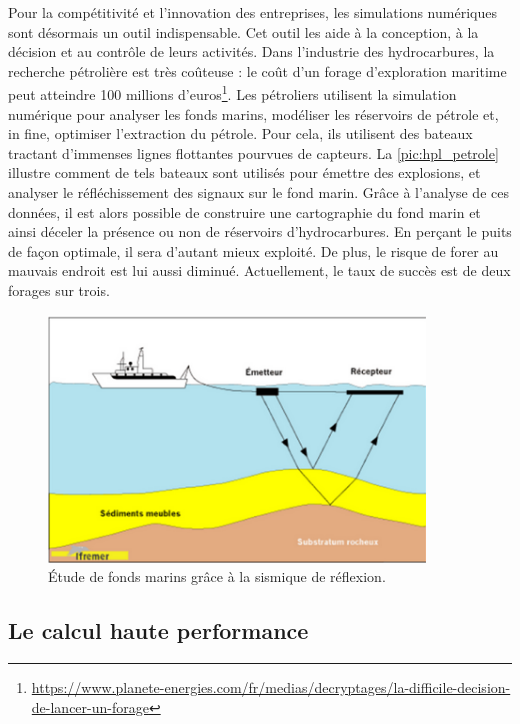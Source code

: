         Pour la compétitivité et l'innovation des entreprises, les simulations numériques sont désormais un outil indispensable. Cet outil les aide à la conception, à la décision et au contrôle de leurs activités. 
        Dans l'industrie des hydrocarbures, la recherche pétrolière est très coûteuse : le coût d'un forage d'exploration maritime peut atteindre 100 millions d'euros\footnote{\url{https://www.planete-energies.com/fr/medias/decryptages/la-difficile-decision-de-lancer-un-forage}}.  Les pétroliers utilisent la simulation numérique pour analyser les fonds marins, modéliser les réservoirs de pétrole et, in fine, optimiser l'extraction du pétrole. Pour cela, ils utilisent des bateaux tractant d'immenses lignes flottantes pourvues de capteurs. La \autoref{pic:hpl_petrole} illustre comment de tels bateaux sont utilisés pour émettre des explosions, et analyser le réfléchissement des signaux sur le fond marin. Grâce à l'analyse de ces données, il est alors possible de construire une cartographie du fond marin et ainsi déceler la présence ou non de réservoirs d'hydrocarbures.  En perçant le puits de façon optimale, il sera d'autant mieux exploité. De plus, le risque de forer au mauvais endroit est lui aussi diminué. Actuellement, le taux de succès est de deux forages sur trois.

        \begin{figure}
            \center
            \includegraphics[width=10cm]{images/hpl_petrole.png}
            \caption{\label{pic:hpl_petrole}Étude de fonds marins grâce à la sismique de réflexion.}
        \end{figure}


\subsection{Le calcul haute performance} \label{sec:supercomputer}
        
